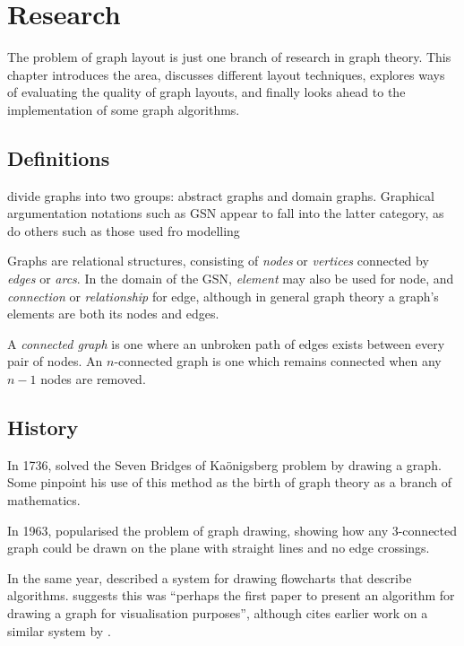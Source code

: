 \chapter{Research}

The problem of graph layout is just one branch of research in graph theory.
This chapter introduces the area, discusses different layout techniques, explores ways of evaluating the quality of graph layouts, and finally looks ahead to the implementation of some graph algorithms.


\section{Definitions}

\citet{huang2007effects} divide graphs into two groups: abstract graphs and domain graphs.
Graphical argumentation notations such as GSN appear to fall into the latter category, as do others such as those used fro modelling 

Graphs are relational structures, consisting of \emph{nodes} or \emph{vertices} connected by \emph{edges} or \emph{arcs}. In the domain of the GSN, \emph{element} may also be used for node, and \emph{connection} or \emph{relationship} for edge, although in general graph theory a graph's elements are both its nodes and edges.

A \emph{connected graph} is one where an unbroken path of edges exists between every pair of nodes. An $n$-connected graph is one which remains connected when any $n-1$ nodes are removed. 

\section{History}

In 1736, \citet{euler} solved the Seven Bridges of Ka\"{o}nigsberg problem by drawing a graph.
Some \cite{alexanderson2006cover} pinpoint his use of this method as the birth of graph theory as a branch of mathematics.

In 1963, \citet{tutte} popularised the problem of graph drawing, showing how any 3-connected
graph could be drawn on the plane with straight lines and no edge crossings.

In the same year, \citet{Knuth63} described a system for drawing flowcharts that describe algorithms. \citet{battista} suggests this was ``perhaps the first paper to present an algorithm for drawing a graph for visualisation purposes'', although \citeauthor{Knuth63} cites earlier work on a similar system by \citet{haibt1959}.



